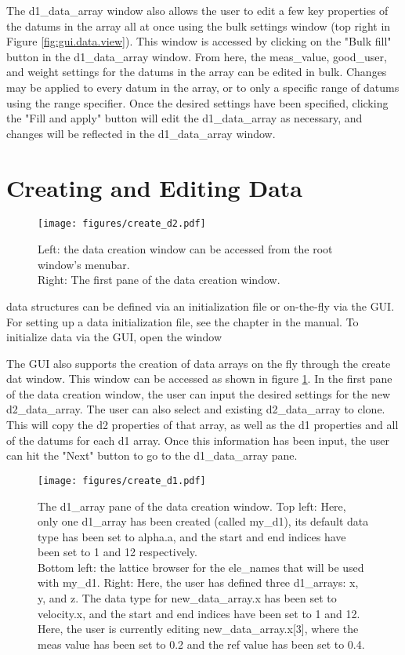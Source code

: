 The d1_data_array window also allows the user to edit a few key properties of the datums in the array all at once using the bulk settings window (top right in Figure \ref{fig:gui.data.view}).
This window is accessed by clicking on the "Bulk fill" button in the d1_data_array window.
From here, the meas_value, good_user, and weight settings for the datums in the array can be edited in bulk.
Changes may be applied to every datum in the array, or to only a specific range of datums using the range specifier.
Once the desired settings have been specified, clicking the "Fill and apply" button will edit the d1_data_array as necessary, and changes will be reflected in the d1_data_array window.

\section{Creating and Editing Data}
\label{s:gui.data.edit}

\begin{figure}
\centering
\texttt{[image: figures/create\_d2.pdf]}
\caption[Data creation window.]{Left: the data creation window can be accessed from the root window's menubar. \\
Right: The first pane of the data creation window.}
\label{fig:gui.create.data.d2}
\end{figure}

\tao data structures can be defined via an initialization file or on-the-fly via the GUI. For setting up a data
initialization file, see the  chapter in the \tao manual. To initialize data via the GUI,
open the  window 

The GUI also supports the creation of data arrays on the fly through the create dat window.
This window can be accessed as shown in figure \ref{fig:gui.create.data.d2}.
In the first pane of the data creation window, the user can input the desired settings for the new d2_data_array.
The user can also select and existing d2_data_array to clone.
This will copy the d2 properties of that array, as well as the d1 properties and all of the datums for each d1 array.
Once this information has been input, the user can hit the "Next" button to go to the d1_data_array pane.

\begin{figure}
\centering
\texttt{[image: figures/create\_d1.pdf]}
\caption[The d1_array pane of the data creation window.]{The d1_array pane of the data creation window. Top left: Here, only one d1_array has been created (called my_d1), its default data type has been set to alpha.a, and the start and end indices have been set to 1 and 12 respectively.  \\
Bottom left: the lattice browser for the ele_names that will be used with my_d1.
Right: Here, the user has defined three d1_arrays: x, y, and z.
The data type for new_data_array.x has been set to velocity.x, and the start and end indices have been set to 1 and 12.
Here, the user is currently editing new_data_array.x[3], where the meas value has been set to 0.2 and the ref value has been set to 0.4.}
\label{fig:gui.create.data.d1}
\end{figure}

